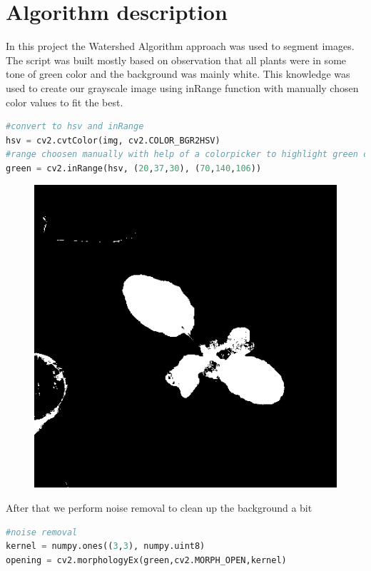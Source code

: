 \documentclass[10pt]{article}
\begin{document}
\section{Algorithm description}
In this project the Watershed Algorithm approach was used to segment images. The script was built mostly based on observation that all plants were in some tone of green color and the background was mainly white. This knowledge was used to create our grayscale image using inRange function with manually chosen color values to fit the best. 
\begin{lstlisting}[language=Python]
#convert to hsv and inRange
hsv = cv2.cvtColor(img, cv2.COLOR_BGR2HSV)
#range choosen manually with help of a colorpicker to highlight green color
green = cv2.inRange(hsv, (20,37,30), (70,140,106))
\end{lstlisting}
\begin{figure}[H]
\includegraphics[width=\textwidth]{../example/grayscale}
\end{figure}
\clearpage
After that we perform noise removal to clean up the background a bit
\begin{lstlisting}[language=Python]
#noise removal
kernel = numpy.ones((3,3), numpy.uint8)
opening = cv2.morphologyEx(green,cv2.MORPH_OPEN,kernel)
\end{lstlisting}
\end{document}
